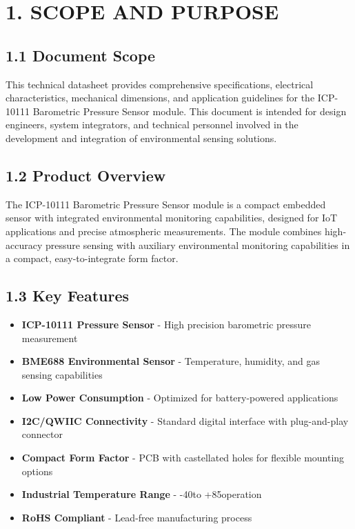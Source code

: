 \documentclass[11pt,a4paper]{article}
\begin{document}
\section{1. SCOPE AND PURPOSE}

\subsection{1.1 Document Scope}

This technical datasheet provides comprehensive specifications, electrical characteristics, mechanical dimensions, and application guidelines for the ICP-10111 Barometric Pressure Sensor module. This document is intended for design engineers, system integrators, and technical personnel involved in the development and integration of environmental sensing solutions.

\subsection{1.2 Product Overview}

The ICP-10111 Barometric Pressure Sensor module is a compact embedded sensor with integrated environmental monitoring capabilities, designed for IoT applications and precise atmospheric measurements. The module combines high-accuracy pressure sensing with auxiliary environmental monitoring capabilities in a compact, easy-to-integrate form factor.

\subsection{1.3 Key Features}

\begin{itemize}
\item \textbf{ICP-10111 Pressure Sensor} - High precision barometric pressure measurement
\item \textbf{BME688 Environmental Sensor} - Temperature, humidity, and gas sensing capabilities
\item \textbf{Low Power Consumption} - Optimized for battery-powered applications
\item \textbf{I2C/QWIIC Connectivity} - Standard digital interface with plug-and-play connector
\item \textbf{Compact Form Factor} - PCB with castellated holes for flexible mounting options
\item \textbf{Industrial Temperature Range} - -40\degreeC to +85\degreeC operation
\item \textbf{RoHS Compliant} - Lead-free manufacturing process
\end{itemize}
\end{document}
